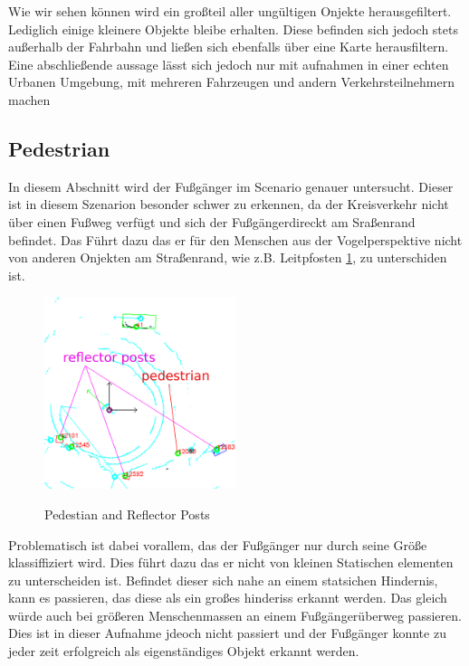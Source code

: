 \documentclass[11pt,oneside,openright]{mpreport}
\begin{document}
Wie wir sehen können wird ein großteil aller ungültigen Onjekte herausgefiltert. Lediglich einige kleinere Objekte bleibe erhalten.
Diese befinden sich jedoch stets außerhalb der Fahrbahn und ließen sich ebenfalls über eine Karte herausfiltern.
Eine abschließende aussage lässt sich jedoch nur mit aufnahmen in einer echten Urbanen Umgebung, mit mehreren Fahrzeugen und andern Verkehrsteilnehmern machen


\subsection{Pedestrian}
In diesem Abschnitt wird der Fußgänger im Scenario genauer untersucht. Dieser ist in diesem Szenarion besonder schwer zu erkennen,
da der Kreisverkehr nicht über einen Fußweg verfügt und sich der Fußgängerdireckt am Sraßenrand befindet.
Das Führt dazu das er für den Menschen aus der Vogelperspektive nicht von anderen Onjekten am Straßenrand, wie z.B. Leitpfosten \cref{refPosts}, zu unterschiden ist.

\begin{figure}[!htb]
  \caption{Pedestian and Reflector Posts} 
  \centering
  \includegraphics[width=0.5\textwidth]{bilder/reflector_posts.png}
 \label{refPosts}
\end{figure}

Problematisch ist dabei vorallem, das der Fußgänger nur durch seine Größe klassiffiziert wird.
Dies führt dazu das er nicht von kleinen Statischen elementen zu unterscheiden ist. Befindet dieser sich
nahe an einem statsichen Hindernis, kann es passieren, das diese als ein großes hinderiss erkannt werden. 
Das gleich würde auch bei größeren Menschenmassen an einem Fußgängerüberweg passieren. Dies ist in dieser Aufnahme 
jdeoch nicht passiert und der Fußgänger konnte zu jeder zeit erfolgreich als eigenständiges Objekt erkannt werden.
\end{document}
